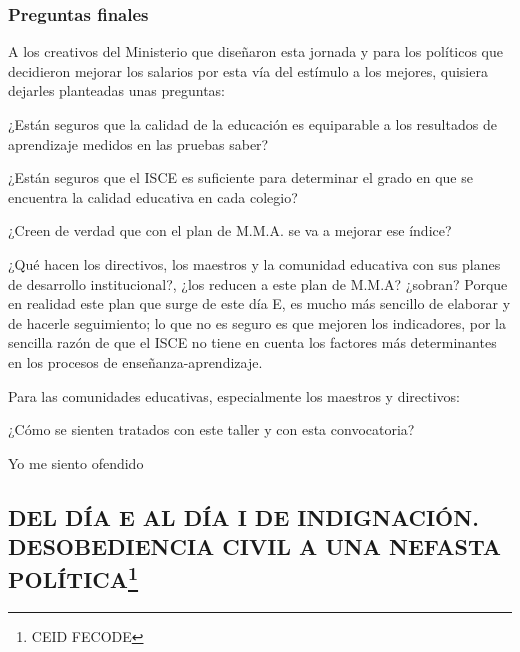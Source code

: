 \documentclass[10pt]{article}
\begin{document}
\subsubsection*{Preguntas finales}
A los creativos del Ministerio que diseñaron esta jornada y para los políticos que decidieron mejorar los salarios por esta vía del estímulo a los mejores, quisiera dejarles planteadas unas preguntas:

¿Están seguros que la calidad de la educación es equiparable a los resultados de aprendizaje medidos en las pruebas saber?

¿Están seguros que el ISCE es suficiente para determinar el grado en que se encuentra la calidad educativa en cada colegio?

¿Creen de verdad que con el plan de M.M.A. se va a mejorar ese índice?

¿Qué hacen los directivos, los maestros y la comunidad educativa con sus planes de desarrollo institucional?, ¿los reducen a este plan de M.M.A? ¿sobran? Porque en realidad este plan que surge de este día E, es mucho más sencillo de elaborar
y de hacerle seguimiento; lo que no es seguro es que mejoren los indicadores, por la sencilla razón de que el ISCE no tiene en cuenta los factores más determinantes en los procesos de enseñanza-aprendizaje.

Para las comunidades educativas, especialmente los maestros y directivos:

¿Cómo se sienten tratados con este taller y con esta convocatoria?

Yo me siento ofendido
\subsection*{DEL DÍA E AL DÍA I DE INDIGNACIÓN.
DESOBEDIENCIA CIVIL A UNA NEFASTA POLÍTICA\footnote{CEID FECODE}}
\end{document}
